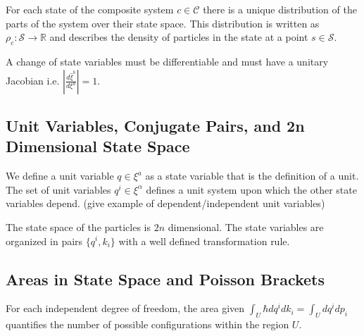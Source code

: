 \documentclass{article}
\begin{document}
\begin{defn}
	For each state of the composite system $c \in \mathcal{C}$ there is a unique distribution of the parts of the system over their state space. This distribution is written as $\rho_c: \mathcal{S} \rightarrow \mathbb{R}$ and describes the density of particles in the state at a point $s \in \mathcal{S}$.
\end{defn}

\begin{prop}
	A change of state variables must be differentiable and must have a unitary Jacobian i.e. $\left|\frac{d\hat{\xi}^b}{d\xi^a}\right| = 1$.
\end{prop}


\subsection{Unit Variables, Conjugate Pairs, and 2n Dimensional State Space}

\begin{defn}
	We define a unit variable $q \in \xi^a$ as a state variable that is the definition of a unit. The set of unit variables $q^i \in \xi^\alpha$ defines a unit system upon which the other state variables depend. (give example of dependent/independent unit variables)
\end{defn}



\begin{prop}
	The state space of the particles is $2n$ dimensional. The state variables are organized in pairs $\{q^i, k_i\}$ with a well defined transformation rule.
\end{prop}

\subsection{Areas in State Space and Poisson Brackets}
	
\begin{prop}
	For each independent degree of freedom, the area given $\int_U \hbar dq^i dk_i = \int_U dq^i dp_i$ quantifies the number of possible configurations within the region $U$.
\end{prop}
\end{document}
